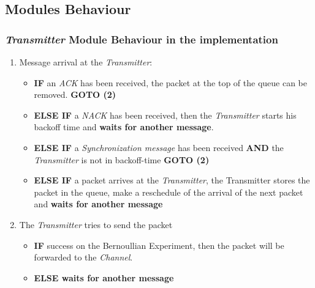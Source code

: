 \subsection{Modules Behaviour}
\subsubsection{\textit{Transmitter} Module Behaviour in the implementation}
\begin{enumerate}
	\item Message arrival at the \textit{Transmitter}:
	\begin{itemize}
		\item \textbf{IF} an \textit{ACK} has been received, the packet at the top of the queue can be removed. \textbf{GOTO (2)}
		\item \textbf{ELSE IF} a \textit{NACK} has been received, then the \textit{Transmitter} starts his backoff time and \textbf{waits for another message}.
		\item \textbf{ELSE IF} a \textit{Synchronization message} has been received \textbf{AND} the \textit{Transmitter} is not in backoff-time \textbf{GOTO (2)}
		\item \textbf{ELSE IF} a packet arrives at the \textit{Transmitter}, the Transmitter stores the packet in the queue, make a reschedule of the arrival of the next packet and \textbf{waits for another message}
	\end{itemize}
	\item The \textit{Transmitter} tries to send the packet
	\begin{itemize}
		\item \textbf{IF} success on the Bernoullian Experiment, then the packet will be forwarded to the \textit{Channel}.
		\item \textbf{ELSE waits for another message}
	\end{itemize}
\end{enumerate}
